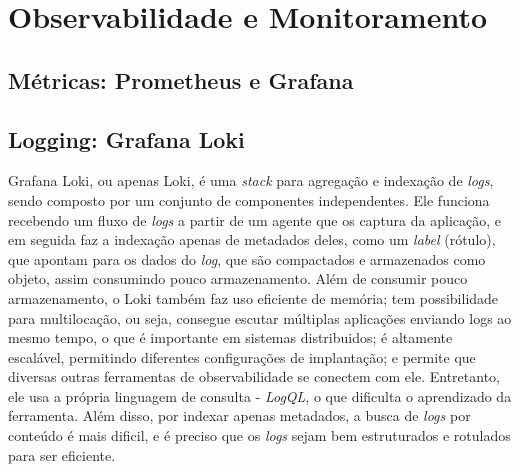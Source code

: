 


\section{Observabilidade e Monitoramento}

\subsection{Métricas: Prometheus e Grafana}

\subsection{Logging: Grafana Loki}
Grafana Loki, ou apenas Loki, é uma \emph{stack} para agregação e indexação de \emph{logs}, sendo composto por um conjunto de componentes independentes. Ele funciona recebendo um fluxo de \emph{logs} a partir de um agente que os captura da aplicação, e em seguida faz a indexação apenas de metadados deles, como um \emph{label} (rótulo), que apontam para os dados do \emph{log}, que são compactados e armazenados como objeto, assim consumindo pouco armazenamento. Além de consumir pouco armazenamento, o Loki também faz uso eficiente de memória; tem possibilidade para multilocação, ou seja, consegue escutar múltiplas aplicações enviando logs ao mesmo tempo, o que é importante em sistemas distribuidos; é altamente escalável, permitindo diferentes configurações de implantação; e permite que diversas outras ferramentas de observabilidade se conectem com ele. Entretanto, ele usa a própria linguagem de consulta - \emph{LogQL}, o que dificulta o aprendizado da ferramenta. Além disso, por indexar apenas metadados, a busca de \emph{logs} por conteúdo é mais dificil, e é preciso que os \emph{logs} sejam bem estruturados e rotulados para ser eficiente. \cite{grafana-loki}

